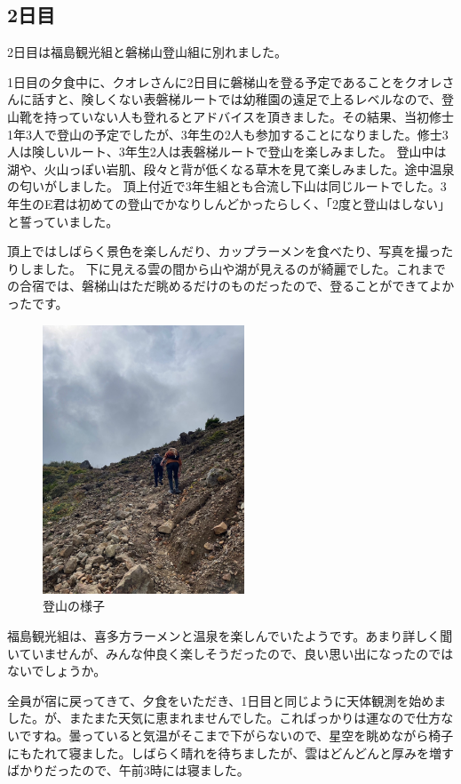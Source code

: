 \documentclass[../main]{subfiles}
\begin{document}
\subsection{2日目}
2日目は福島観光組と磐梯山登山組に別れました。

1日目の夕食中に、クオレさんに2日目に磐梯山を登る予定であることをクオレさんに話すと、険しくない表磐梯ルートでは幼稚園の遠足で上るレベルなので、登山靴を持っていない人も登れるとアドバイスを頂きました。その結果、当初修士1年3人で登山の予定でしたが、3年生の2人も参加することになりました。修士3人は険しいルート、3年生2人は表磐梯ルートで登山を楽しみました。
登山中は湖や、火山っぽい岩肌、段々と背が低くなる草木を見て楽しみました。途中温泉の匂いがしました。
頂上付近で3年生組とも合流し下山は同じルートでした。3年生のE君は初めての登山でかなりしんどかったらしく、「2度と登山はしない」と誓っていました。

頂上ではしばらく景色を楽しんだり、カップラーメンを食べたり、写真を撮ったりしました。
下に見える雲の間から山や湖が見えるのが綺麗でした。これまでの合宿では、磐梯山はただ眺めるだけのものだったので、登ることができてよかったです。
\begin{figure}[H]
\centering
\includegraphics[width=6cm]{sections/Nakahara/IMG_8389.jpg}
\caption{登山の様子}
\centering
\end{figure}

福島観光組は、喜多方ラーメンと温泉を楽しんでいたようです。あまり詳しく聞いていませんが、みんな仲良く楽しそうだったので、良い思い出になったのではないでしょうか。

全員が宿に戻ってきて、夕食をいただき、1日目と同じように天体観測を始めました。が、またまた天気に恵まれませんでした。こればっかりは運なので仕方ないですね。曇っていると気温がそこまで下がらないので、星空を眺めながら椅子にもたれて寝ました。しばらく晴れを待ちましたが、雲はどんどんと厚みを増すばかりだったので、午前3時には寝ました。
\end{document}
